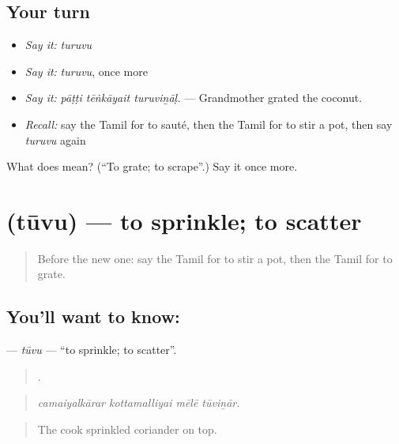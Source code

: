\subsection*{Your turn}
\begin{itemize}
\raggedright
  \item \emph{Say it:} \emph{turuvu}
  \item \emph{Say it:} \emph{turuvu}, once more
  \item \emph{Say it:} \emph{pāṭṭi tēṅkāyait turuviṉāḷ.} — Grandmother grated the coconut.
  \item \emph{Recall:} say the Tamil for to sauté, then the Tamil for to stir a pot, then say \emph{turuvu} again
\end{itemize}

\begin{tcolorbox}[breakable,colback=teal!4,colframe=teal!35!black,title={Before you move on}]
What does  mean? (\textquotedblleft{}To grate; to scrape\textquotedblright{}.) Say it once more.
\end{tcolorbox}
\section[\texorpdfstring{\ta{தூவு} (tūvu)}{தூவு (tūvu)}]{ (tūvu) — to sprinkle; to scatter}

\label{lesson:TA-C526-tuvu}



\begin{quote}
Before the new one: say the Tamil for to stir a pot, then the Tamil for to grate.
\end{quote}

\subsection*{You'll want to know: }
\textbf{} — \emph{tūvu} — \textquotedblleft{}to sprinkle; to scatter\textquotedblright{}.

\begin{quote}
   .
\end{quote}

\begin{quote}
\emph{camaiyalkārar kottamalliyai mēlē tūviṉār.}
\end{quote}

\begin{quote}
The cook sprinkled coriander on top.
\end{quote}

